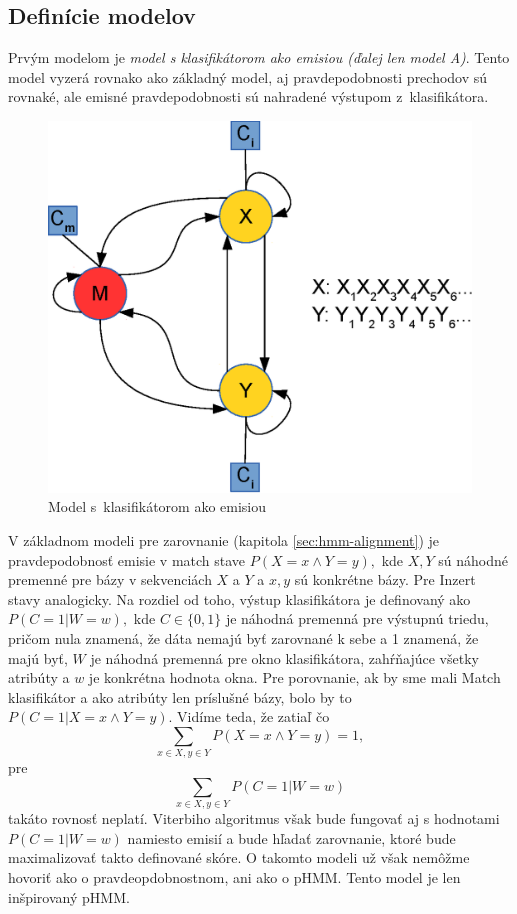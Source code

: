 \subsection{Definície modelov}

Prvým modelom je \textit{model s klasifikátorom ako emisiou (ďalej len model A)}. Tento model vyzerá rovnako ako základný model, aj pravdepodobnosti prechodov sú rovnaké, ale emisné pravdepodobnosti sú nahradené výstupom z~klasifikátora.
\begin{figure}[htp]
    \centering
    \includegraphics[width=.5\textwidth]{images/model_clf}
    \caption{Model s~klasifikátorom ako emisiou}
\end{figure}

V základnom modeli pre zarovnanie (kapitola \ref{sec:hmm-alignment}) je pravdepodobnosť emisie v match stave $P(X=x \wedge Y=y),$ kde $X, Y$ sú náhodné premenné pre bázy v sekvenciách $X$ a $Y$ a $x, y$ sú konkrétne bázy. Pre Inzert stavy analogicky.
Na rozdiel od toho, výstup klasifikátora je definovaný ako $P(C=1 | W=w),$ kde $C \in \{0,1\}$ je náhodná premenná pre výstupnú triedu, pričom nula znamená, že dáta nemajú byť zarovnané k sebe a 1 znamená, že majú byť, $W$ je náhodná premenná pre okno klasifikátora, zahŕňajúce všetky atribúty a $w$ je konkrétna hodnota okna.
Pre porovnanie, ak by sme mali Match klasifikátor a ako atribúty len príslušné bázy, bolo by to $P(C=1 | X=x \wedge Y=y)$. Vidíme teda, že zatiaľ čo
$$\sum_{x \in X, y \in Y} P(X=x \wedge Y=y) = 1,$$
pre
$$\sum_{x \in X, y \in Y} P(C=1| W=w)$$
takáto rovnosť neplatí.
Viterbiho algoritmus však bude fungovať aj s hodnotami $P(C=1| W=w)$ namiesto emisií a bude hľadať zarovnanie, ktoré bude maximalizovať takto definované skóre.
O takomto modeli už však nemôžme hovoriť ako o pravdeopdobnostnom, ani ako o pHMM. Tento model je len inšpirovaný pHMM.

